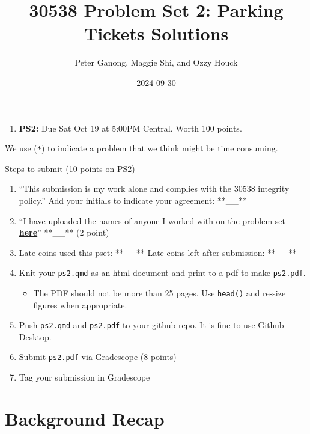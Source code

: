 \documentclass[
  letterpaper,
  DIV=11,
  numbers=noendperiod]{scrartcl}
\title{30538 Problem Set 2: Parking Tickets Solutions}
\author{Peter Ganong, Maggie Shi, and Ozzy Houck}
\date{2024-09-30}
\providecommand{\tightlist}{%
  \setlength{\itemsep}{0pt}\setlength{\parskip}{0pt}}\usepackage{longtable,booktabs,array}
\begin{document}
\maketitle



\begin{enumerate}
\def\labelenumi{\arabic{enumi}.}
\tightlist
\item
  \textbf{PS2:} Due Sat Oct 19 at 5:00PM Central. Worth 100 points.
\end{enumerate}

We use (\texttt{*}) to indicate a problem that we think might be time
consuming.

Steps to submit (10 points on PS2)

\begin{enumerate}
\def\labelenumi{\arabic{enumi}.}
\tightlist
\item
  ``This submission is my work alone and complies with the 30538
  integrity policy.'' Add your initials to indicate your agreement:
  **\_\_**
\item
  ``I have uploaded the names of anyone I worked with on the problem set
  \textbf{\href{https://docs.google.com/forms/d/185usrCREQaUbvAXpWhChkjghdGgmAZXA3lPWpXLLsts/edit}{here}}''
  **\_\_** (2 point)
\item
  Late coins used this pset: **\_\_** Late coins left after submission:
  **\_\_**
\item
  Knit your \texttt{ps2.qmd} as an html document and print to a pdf to
  make \texttt{ps2.pdf}.

  \begin{itemize}
  \tightlist
  \item
    The PDF should not be more than 25 pages. Use \texttt{head()} and
    re-size figures when appropriate.
  \end{itemize}
\item
  Push \texttt{ps2.qmd} and \texttt{ps2.pdf} to your github repo. It is
  fine to use Github Desktop.
\item
  Submit \texttt{ps2.pdf} via Gradescope (8 points)
\item
  Tag your submission in Gradescope
\end{enumerate}

\section{Background Recap}\label{background-recap}
\end{document}

